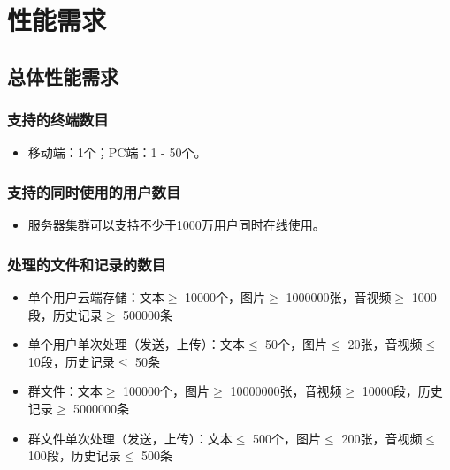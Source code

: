 














\section{性能需求}
\subsection{总体性能需求}

\subsubsection{支持的终端数目}
\begin{itemize}
	\item 移动端：1个；PC端：1 - 50个。
\end{itemize}
\subsubsection{支持的同时使用的用户数目}
\begin{itemize}
	\item 服务器集群可以支持不少于1000万用户同时在线使用。
\end{itemize}
\subsubsection{处理的文件和记录的数目}
\begin{itemize}
	\item 单个用户云端存储：文本$\geq$ 10000个，图片$\geq$ 1000000张，音视频$\geq$ 1000段，历史记录$\geq$ 500000条 
	\item 单个用户单次处理（发送，上传）：文本$\leq$ 50个，图片$\leq$ 20张，音视频$\leq$ 10段，历史记录$\leq$ 50条
	\item 群文件：文本$\geq$ 100000个，图片$\geq$ 10000000张，音视频$\geq$ 10000段，历史记录$\geq$ 5000000条 
	\item 群文件单次处理（发送，上传）：文本$\leq$ 500个，图片$\leq$ 200张，音视频$\leq$ 100段，历史记录$\leq$ 500条 
\end{itemize}
